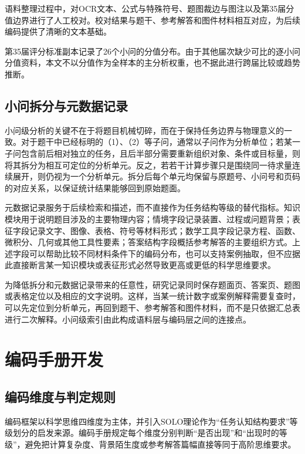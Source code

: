 \documentclass[
  12pt,
  a4paper]{ctexbook}
\begin{document}
语料整理过程中，对OCR文本、公式与特殊符号、题图裁边与图注以及第35届分值边界进行了人工校对。校对结果与题干、参考解答和图件材料相互对应，为后续编码提供了清晰的文本基础。

第35届评分标准副本记录了26个小问的分值分布。由于其他届次缺少可比的逐小问分值资料，本文不以分值作为全样本的主分析权重，也不据此进行跨届比较或趋势推断。

\subsection{小问拆分与元数据记录}\label{ux5c0fux95eeux62c6ux5206ux4e0eux5143ux6570ux636eux8bb0ux5f55}

小问级分析的关键不在于将题目机械切碎，而在于保持任务边界与物理意义的一致。对于题干中已经标明的（1）、（2）等子问，通常以子问作为分析单位；若某一子问包含前后相对独立的任务，且后半部分需要重新组织对象、条件或目标量，则将其拆分为相互可定位的分析单元。反之，若若干计算步骤只是围绕同一待求量连续展开，则仍视为一个分析单元。拆分后每个单元均保留与原题号、小问号和页码的对应关系，以保证统计结果能够回到原始题面。

元数据记录服务于后续检索和描述，而不直接作为任务结构等级的替代指标。知识模块用于说明题目涉及的主要物理内容；情境字段记录装置、过程或问题背景；表征字段记录文字、图像、表格、符号等材料形式；数学工具字段记录方程、函数、微积分、几何或其他工具性要素；答案结构字段概括参考解答的主要组织方式。上述字段可以帮助比较不同材料条件下的编码分布，也可以支持案例抽取，但不应据此直接断言某一知识模块或表征形式必然导致更高或更低的科学思维要求。

为降低拆分和元数据记录带来的任意性，研究记录同时保存题面页、答案页、题图或表格定位以及相应的文字说明。这样，当某一统计数字或案例解释需要复查时，可以先定位到分析单元，再回到题干、参考解答和图件材料，而不是只依据汇总表进行二次解释。小问级索引由此构成语料层与编码层之间的连接点。

\section{编码手册开发}\label{ux7f16ux7801ux624bux518cux5f00ux53d1}

\subsection{编码维度与判定规则}\label{ux7f16ux7801ux7ef4ux5ea6ux4e0eux5224ux5b9aux89c4ux5219}

编码框架以科学思维四维度为主体，并引入SOLO理论作为``任务认知结构要求''等级划分的启发来源。编码手册规定每个维度分别判断``是否出现''和``出现时的等级''，避免把计算复杂度、背景陌生度或参考解答篇幅直接等同于高阶思维要求。
\end{document}
